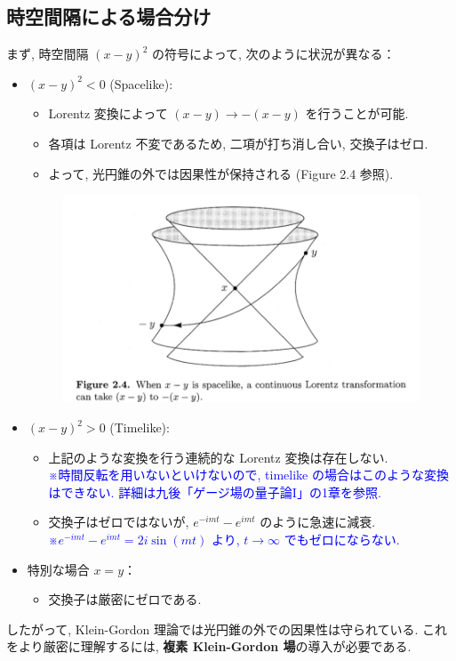 \documentclass[a4paper,12pt]{article}
\begin{document}
\subsection*{時空間隔による場合分け}
まず, 時空間隔 $(x - y)^2$ の符号によって, 次のように状況が異なる：
\begin{itemize}
  \item $(x - y)^2 < 0$ (Spacelike):
  \begin{itemize}
    \item Lorentz 変換によって $(x - y) \to -(x - y)$ を行うことが可能.
    \item 各項は Lorentz 不変であるため, 二項が打ち消し合い, 交換子はゼロ.
    \item よって, 光円錐の外では因果性が保持される (Figure 2.4 参照).
  \end{itemize}

  \begin{figure}[H]
    \centering
    \includegraphics[width=1\textwidth]{PeskinQFT_Sec2-4_fig/fig2-4.png}
\end{figure}

  \item $(x - y)^2 > 0$ (Timelike):
  \begin{itemize}
    \item 上記のような変換を行う連続的な Lorentz 変換は存在しない.\\
    \textcolor{blue}{※時間反転を用いないといけないので, timelike の場合はこのような変換はできない. 詳細は九後「ゲージ場の量子論I」の1章を参照.}
    \item 交換子はゼロではないが, $e^{-imt} - e^{imt}$ のように急速に減衰.\\
    \textcolor{blue}{※$e^{-imt} - e^{imt} = 2i\sin(mt)$ より, $t \to \infty$ でもゼロにならない.}
  \end{itemize}

  \item 特別な場合 $x = y$：
  \begin{itemize}
    \item 交換子は厳密にゼロである.
  \end{itemize}
\end{itemize}
したがって, Klein-Gordon 理論では光円錐の外での因果性は守られている. これをより厳密に理解するには, \textbf{複素 Klein-Gordon 場}の導入が必要である.
\end{document}
